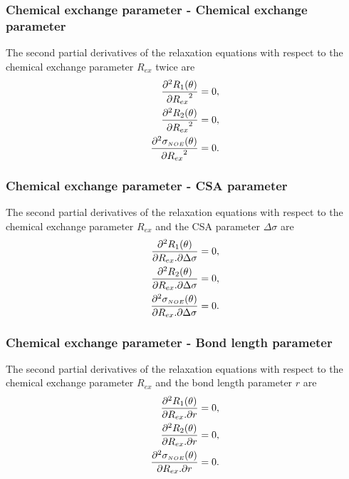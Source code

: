 \subsubsection{Chemical exchange parameter - Chemical exchange parameter}

The second partial derivatives of the relaxation equations with respect to the chemical exchange parameter $R_{ex}$ twice are
\begin{align}
    \frac{\partial^2 R_1(\theta)}{{\partial R_{ex}}^2} &= 0,        \label{eq: Ri': d2R1/dRex2} \\
    \frac{\partial^2 R_2(\theta)}{{\partial R_{ex}}^2} &= 0,        \label{eq: Ri': d2R2/dRex2} \\
    \frac{\partial^2 \sigma_{\scriptscriptstyle NOE}(\theta)}{{\partial R_{ex}}^2} &= 0.  \label{eq: Ri': d2sigmaNOE/dRex2}
\end{align}


\subsubsection{Chemical exchange parameter - CSA parameter}

The second partial derivatives of the relaxation equations with respect to the chemical exchange parameter $R_{ex}$ and the CSA parameter $\Delta\sigma$ are
\begin{align}
    \frac{\partial^2 R_1(\theta)}{\partial R_{ex} . \partial \Delta\sigma} &= 0,        \label{eq: Ri': d2R1/dRex.dCSA} \\
    \frac{\partial^2 R_2(\theta)}{\partial R_{ex} . \partial \Delta\sigma} &= 0,        \label{eq: Ri': d2R2/dRex.dCSA} \\
    \frac{\partial^2 \sigma_{\scriptscriptstyle NOE}(\theta)}{\partial R_{ex} . \partial \Delta\sigma} &= 0.  \label{eq: Ri': d2sigmaNOE/dRex.dCSA}
\end{align}


\subsubsection{Chemical exchange parameter - Bond length parameter}

The second partial derivatives of the relaxation equations with respect to the chemical exchange parameter $R_{ex}$ and the bond length parameter $r$ are
\begin{align}
    \frac{\partial^2 R_1(\theta)}{\partial R_{ex} . \partial r} &= 0,           \label{eq: Ri': d2R1/dRex.dr} \\
    \frac{\partial^2 R_2(\theta)}{\partial R_{ex} . \partial r} &= 0,           \label{eq: Ri': d2R2/dRex.dr} \\
    \frac{\partial^2 \sigma_{\scriptscriptstyle NOE}(\theta)}{\partial R_{ex} . \partial r} &= 0.     \label{eq: Ri': d2sigmaNOE/dRex.dr}
\end{align}


